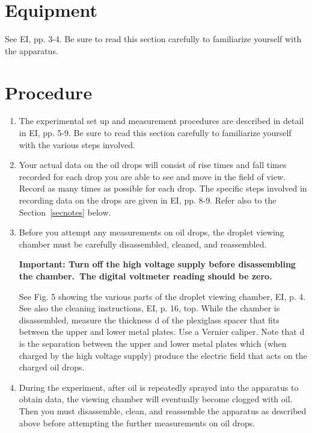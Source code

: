 \documentclass{article}
\begin{document}
\section{Equipment}
See EI, pp. 3-4.  Be sure to read this section carefully to
familiarize yourself with the apparatus.


\section{Procedure}

\begin{enumerate}
\item The experimental set up and measurement procedures are described
in detail in EI, pp. 5-9. Be sure to read this section carefully to
familiarize yourself with the various steps involved.


\item Your actual data on the oil drops will consist of rise times and
fall times recorded for each drop you are able to see and move in the
field of view.  Record as many times as possible for each drop. The
specific steps involved in recording data on the drops are given in EI,
pp. 8-9.  Refer also to the Section~\ref{secnotes} below.

\item Before you attempt any measurements on oil drops, the droplet
viewing chamber must be carefully disassembled, cleaned, and
reassembled.

{\bfseries Important: Turn off the high voltage supply before disassembling the
chamber.\ The digital voltmeter reading should be zero.}

See Fig. 5 showing the various parts of the droplet viewing chamber,
EI, p. 4.  See also the cleaning instructions, EI, p. 16, top. While
the chamber is disassembled, measure the thickness d of the plexiglass
spacer that fits between the upper and lower metal plates. Use a
Vernier caliper.  Note that d is the separation between the upper and
lower metal plates which (when charged by the high voltage supply)
produce the electric field that acts on the charged oil drops.


\item During the experiment, after oil is repeatedly sprayed into the
apparatus to obtain data, the viewing chamber will eventually become
clogged with oil. Then you must disassemble, clean, and reassemble the
apparatus as described above before attempting the further measurements
on oil drops.
\end{enumerate}
\end{document}
